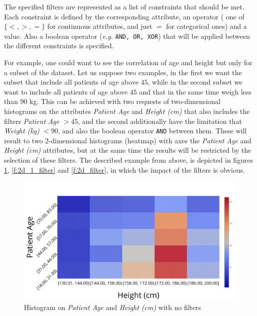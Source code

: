 The specified filters are represented as a list of constraints that should be met.
Each constraint is defined by the corresponding attribute, an operator ( one of $\{<, >, =\}$ for continuous attributes, and just $=$ for categorical ones) and a value.
Also a boolean operator (\textit{e.g.} \texttt{AND, OR, XOR}) that will be applied between the different constraints is specified.


For example, one could want to see the correlation of age and height but only for a subset of the dataset.
Let us suppose two examples, in the first we want the subset that include all patients of age above $45$, while in the second subset we want to include all patients of age above $45$ and that in the same time weigh less than $90$ kg.
This can be achieved with two requests of two\hyp dimensional histograms on the attributes \textit{Patient Age} and \textit{Height (cm)} that also includes the filters \textit{Patient Age} $ > 45$, and the second additionally have the limitation that \textit{Weight (kg)} $ < 90$, and also the boolean operator \texttt{AND} between them.
These will result to two 2\hyp dimensional histograms (heatmap) with axes the \textit{Patient Age} and \textit{Height (cm)} attributes, but at the same time the results will be restricted by the selection of these filters.
The described example from above, is depicted in figures \ref{f:2d_no_filter}, \ref{f:2d_1_filter} and \ref{f:2d_filter}, in which the impact of the filters is obvious.


\begin{figure}[t]
  \centering
  \includegraphics[width=0.8\linewidth]{figures/2d_no_filter.png}
  \caption{Histogram on \textit{Patient Age} and \textit{Height (cm)} with no filters}
  \label{f:2d_no_filter}
\end{figure}

